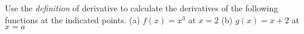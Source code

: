 
Use the {\it definition} of derivative to calculate the derivatives of the
following functions at the indicated points.
\medskip
(a) $f(x)=x^3$ at $x=2$
\medskip
(b) $g(x)=x+2$ at $x=a$


